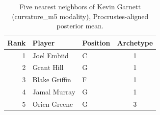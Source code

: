 \begin{table}[htbp]
  \centering\small
  \begin{tabular}{rllc}
    \toprule
    Rank & Player & Position & Archetype \\
    \midrule
    1 & Joel Embiid & C & 1 \\
    2 & Grant Hill & G & 1 \\
    3 & Blake Griffin & F & 1 \\
    4 & Jamal Murray & G & 1 \\
    5 & Orien Greene & G & 3 \\
    \bottomrule
  \end{tabular}
  \caption{Five nearest neighbors of Kevin Garnett (curvature_m5 modality), Procrustes-aligned posterior mean.}
  \label{tab:Kevin_Garnett_neighbors_curvature_m5}
\end{table}

